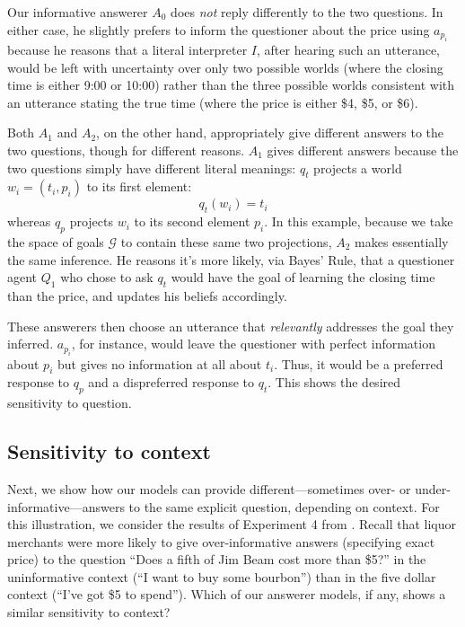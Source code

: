 \documentclass[12pt, floatsintext, jou]{apa6}
\begin{document}
Our informative answerer $A_0$ does \emph{not} reply differently to the two questions. In either case, he slightly prefers to inform the questioner about the price using $a_{p_i}$ because he reasons that a literal interpreter $I$, after hearing such an utterance, would be left with uncertainty over only two possible worlds (where the closing time is either 9:00 or 10:00) rather than the three possible worlds consistent with an utterance stating the true time (where the price is either \$4, \$5, or \$6).

Both $A_1$ and $A_2$, on the other hand, appropriately give different answers to the two questions, though for different reasons. $A_1$ gives different answers because the two questions simply have different literal meanings: $q_t$ projects a world $w_i = (t_i, p_i)$ to its first element:$$q_t(w_i) = t_i$$ whereas $q_p$ projects $w_i$ to its second element $p_i$. In this example, because we take the space of goals $\mathcal{G}$ to contain these same two projections, $A_2$ makes essentially the same inference. He reasons it's more likely, via Bayes' Rule, that a questioner agent $Q_1$ who chose to ask $q_t$ would have the goal of learning the closing time than the price, and updates his beliefs accordingly.

These answerers then choose an utterance that \emph{relevantly} addresses the goal they inferred. $a_{p_i}$, for instance, would leave the questioner with perfect information about $p_i$ but gives no information at all about $t_i$. Thus, it would be a preferred response to $q_p$ and a dispreferred response to $q_t$. This shows the desired sensitivity to question.

\subsection{Sensitivity to context}

Next, we show how our models can provide different---sometimes over- or under-informative---answers to the same explicit question, depending on context. For this illustration, we consider the results of Experiment 4 from . Recall that liquor merchants were more likely to give over-informative answers (specifying exact price) to the question ``Does a fifth of Jim Beam cost more than \$5?'' in the uninformative context (``I want to buy some bourbon'') than in the five dollar context (``I've got \$5 to spend''). Which of our answerer models, if any, shows a similar sensitivity to context?
\end{document}
